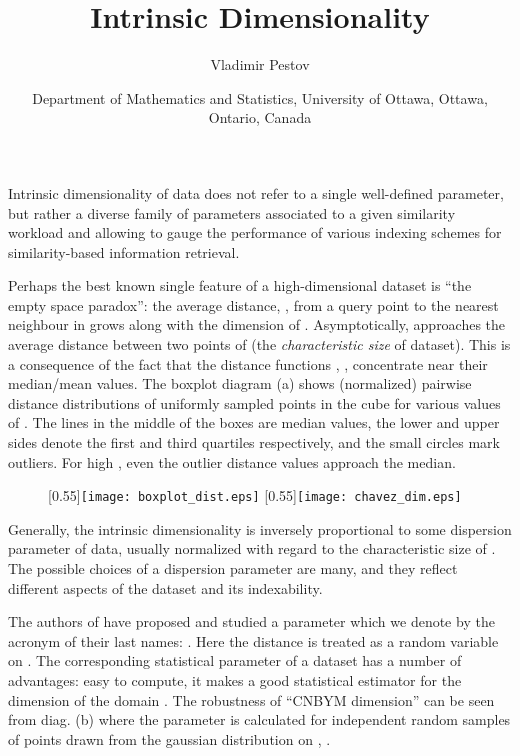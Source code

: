 \documentclass[12pt]{article}
\begin{document}
\title{Intrinsic Dimensionality}

\author{Vladimir Pestov}
\date{\small Department of Mathematics and Statistics, University of Ottawa, Ottawa, Ontario, Canada}


\maketitle

Intrinsic dimensionality of data does not refer to a single well-defined parameter, but rather a diverse family of parameters associated to a given similarity workload  and allowing to gauge the performance of various indexing schemes for similarity-based information retrieval.

Perhaps the best known single feature of a high-dimensional dataset  is ``the empty space paradox'': the average distance, , from a query point to the nearest neighbour in  grows along with the dimension of . Asymptotically,  approaches the average distance  between two points of  (the {\em characteristic size} of dataset). 
This is a consequence of the fact that the distance functions , , concentrate near their median/mean values. The boxplot diagram (a) shows (normalized) pairwise distance distributions of  uniformly sampled points in the cube  for various values of . The lines in the middle of the boxes are median values, the lower and upper sides denote the first and third quartiles respectively, and the small circles mark outliers. For high , even the outlier distance values approach the median.

\begin{figure}[ht]
\begin{center}
\scalebox{0.55}[0.55]{\texttt{[image: boxplot\_dist.eps]}} 
\scalebox{0.55}[0.55]{\texttt{[image: chavez\_dim.eps]}} 
\end{center}
\end{figure}  

Generally, the intrinsic dimensionality is 
inversely proportional to some dispersion parameter of data, usually normalized with regard to the characteristic size of . The possible choices of a dispersion parameter are many, and they reflect different aspects of the dataset and its indexability.

\smallskip

The authors of \cite{CNBYM} have proposed and studied a parameter which we denote by the acronym of their last names: . Here the distance  is treated as a random variable on . The corresponding statistical parameter of a dataset  has a number of advantages: easy to compute, it makes a good statistical estimator for the dimension of the domain . The robustness of ``CNBYM dimension'' can be seen from diag. (b) where the parameter is calculated for independent random samples of  points drawn from the gaussian distribution  on , .
\smallskip 
\end{document}
